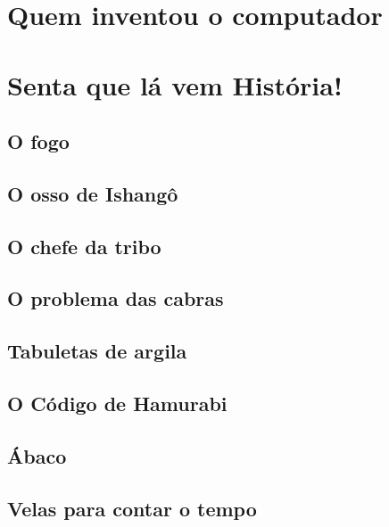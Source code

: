 	\section[Quem inventou o computador]{Quem inventou o computador}
	
			
		\section[Senta que lá vem História!]{Senta que lá vem História!}
	
	
	\subsection[O fogo]{O fogo}
	
		
		\subsection[O osso de Ishangô]{O osso de Ishangô}


	\subsection[O chefe da tribo]{O chefe da tribo}


	\subsection[O problema das cabras]{O problema das cabras}


	\subsection[Tabuletas de argila]{Tabuletas de argila}

	
	\subsection[O Código de Hamurabi]{O Código de Hamurabi}


\subsection[Ábaco]{Ábaco}


\subsection[Velas para contar o tempo]{Velas para contar o tempo}

	
